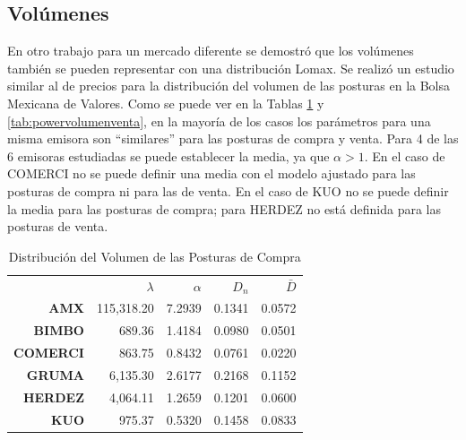 \documentclass[11pt]{article}
\numberwithin{equation}{section} %
\begin{document}
\clearpage

\subsection{Volúmenes}

En otro trabajo para un mercado diferente \cite{marketsdigest} se demostró que los volúmenes también se pueden representar con una distribución Lomax. Se realizó un estudio similar al de precios para la distribución del volumen de las posturas en la Bolsa Mexicana de Valores. Como se puede ver en la Tablas \ref{tab:powervolumencompra} y \ref{tab:powervolumenventa}, en la mayoría de los casos los parámetros para una misma emisora son ``similares'' para las posturas de compra y venta. Para 4 de las 6 emisoras estudiadas se puede establecer la media, ya que $\alpha > 1$. En el caso de COMERCI no se puede definir una media con el modelo ajustado para las posturas de compra ni para las de venta. En el caso de KUO no se puede definir la media para las posturas de compra; para HERDEZ no está definida para las posturas de venta.\\

\begin{table}[htbp]
\centering
\caption{Distribución del Volumen de las Posturas de Compra}
\renewcommand{\arraystretch}{1.2}
\begin{tabular}{r|r|r|r|r|}
\cline{2-5}
& $\lambda$ & $\alpha$ & $D_n$ & $\bar{D}$ \\
\cline{2-5}
\textbf{AMX} & 115,318.20 & 7.2939 & 0.1341 & 0.0572 \\
\textbf{BIMBO} & 689.36 & 1.4184 & 0.0980 & 0.0501 \\
\textbf{COMERCI}   & 863.75 & 0.8432 & 0.0761 & 0.0220 \\
\textbf{GRUMA} & 6,135.30 & 2.6177 & 0.2168 & 0.1152 \\
\textbf{HERDEZ}   & 4,064.11 & 1.2659 & 0.1201 & 0.0600 \\
\textbf{KUO}   & 975.37 & 0.5320 & 0.1458 & 0.0833 \\
\cline{2-5}
\end{tabular}%
\label{tab:powervolumencompra}%
\end{table}%
\end{document}
